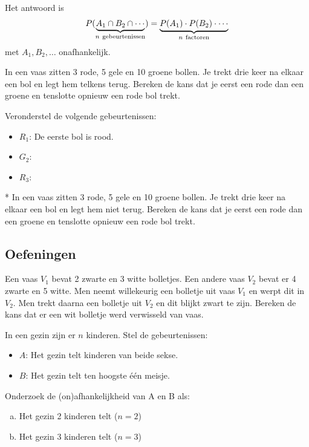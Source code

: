 \documentclass[12pt,twoside]{article}
\begin{document}
Het antwoord is
$$P(\underbrace{A_1\cap B_2\cap\cdots}_{n\mbox{ \scriptsize gebeurtenissen}})=\underbrace{P(A_1)\cdot P(B_2)\cdot \cdots}_{n\mbox{ \scriptsize factoren}}$$
met $A_1, B_2, \ldots$ onafhankelijk.

\begin{oefening}
In een vaas zitten 3 rode, 5 gele en 10 groene bollen. Je trekt drie keer na elkaar een bol en legt hem telkens terug. Bereken de kans dat je eerst een rode dan een groene en tenslotte opnieuw een rode bol trekt.

Veronderstel de volgende gebeurtenissen:
\begin{itemize}
  \itemsep0.2em
  \item $R_1$: De eerste bol is rood.
  \item $G_2$: \arulefill
  \item $R_3$: \arulefill
\end{itemize}
\vspace*{0.1cm}
\end{oefening}

\begin{oefening}*
In een vaas zitten 3 rode, 5 gele en 10 groene bollen. Je trekt drie keer na elkaar een bol en legt hem niet terug. Bereken de kans dat je eerst een rode dan een groene en tenslotte opnieuw een rode bol trekt.
\end{oefening}

\subsection{Oefeningen}

\begin{oefening}
Een vaas $V_1$ bevat 2 zwarte en 3 witte bolletjes. Een andere vaas $V_2$ bevat er 4 zwarte
en 5 witte. Men neemt willekeurig een bolletje uit vaas $V_1$ en werpt dit in $V_2$. Men
trekt daarna een bolletje uit $V_2$ en dit blijkt zwart te zijn. Bereken de kans dat er een
wit bolletje werd verwisseld van vaas.
\end{oefening}

\begin{oefening}
In een gezin zijn er $n$ kinderen. Stel de gebeurtenissen:
\begin{itemize}
  \item $A$: Het gezin telt kinderen van beide sekse.
  \item $B$: Het gezin telt ten hoogste één meisje.
\end{itemize}
	Onderzoek de (on)afhankelijkheid van A en B als:
\begin{enumerate}[(a)]
  \item Het gezin 2 kinderen telt ($n = 2$)
  \item Het gezin 3 kinderen telt ($n = 3$)
\end{enumerate}
\end{oefening}
\end{document}
